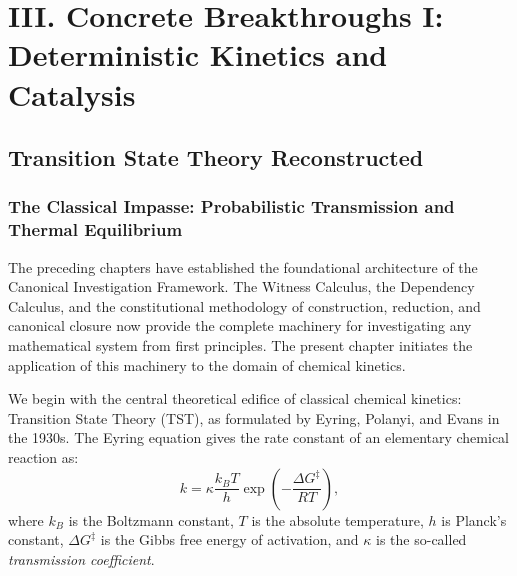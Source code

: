 \documentclass[11pt,openany]{extbook}
\theoremstyle{plain}
\theoremstyle{definition}
\begin{document}
\part{III. Concrete Breakthroughs I: Deterministic Kinetics and Catalysis}

\chapter{Transition State Theory Reconstructed}

\section{The Classical Impasse: Probabilistic Transmission and Thermal Equilibrium}

\noindent The preceding chapters have established the foundational architecture of the Canonical Investigation Framework. The Witness Calculus, the Dependency Calculus, and the constitutional methodology of construction, reduction, and canonical closure now provide the complete machinery for investigating any mathematical system from first principles. The present chapter initiates the application of this machinery to the domain of chemical kinetics.

\noindent We begin with the central theoretical edifice of classical chemical kinetics: Transition State Theory (TST), as formulated by Eyring, Polanyi, and Evans in the 1930s. The Eyring equation gives the rate constant of an elementary chemical reaction as:
\[
k = \kappa \frac{k_B T}{h} \exp\!\left(-\frac{\Delta G^{\ddagger}}{RT}\right),
\]
where $k_B$ is the Boltzmann constant, $T$ is the absolute temperature, $h$ is Planck's constant, $\Delta G^{\ddagger}$ is the Gibbs free energy of activation, and $\kappa$ is the so-called \emph{transmission coefficient}.
\end{document}
